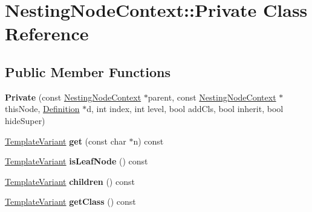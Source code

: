 \hypertarget{class_nesting_node_context_1_1_private}{}\section{Nesting\+Node\+Context\+::Private Class Reference}
\label{class_nesting_node_context_1_1_private}
\subsection*{Public Member Functions}
\begin{DoxyCompactItemize}
\item 
\mbox{\label{class_nesting_node_context_1_1_private_afd833b8f39bf1fce3a21b96e15a5de10}} 
{\bfseries Private} (const \mbox{\hyperlink{class_nesting_node_context}{Nesting\+Node\+Context}} $\ast$parent, const \mbox{\hyperlink{class_nesting_node_context}{Nesting\+Node\+Context}} $\ast$this\+Node, \mbox{\hyperlink{class_definition}{Definition}} $\ast$d, int index, int level, bool add\+Cls, bool inherit, bool hide\+Super)
\item 
\mbox{\label{class_nesting_node_context_1_1_private_aff4ba65cd777440da1b8933ce68e07a4}} 
\mbox{\hyperlink{class_template_variant}{Template\+Variant}} {\bfseries get} (const char $\ast$n) const
\item 
\mbox{\label{class_nesting_node_context_1_1_private_a6d570fc55ae6f2b04a7eec21c294de6f}} 
\mbox{\hyperlink{class_template_variant}{Template\+Variant}} {\bfseries is\+Leaf\+Node} () const
\item 
\mbox{\label{class_nesting_node_context_1_1_private_ac27dfb15571630ca77f6709cd6cdd209}} 
\mbox{\hyperlink{class_template_variant}{Template\+Variant}} {\bfseries children} () const
\item 
\mbox{\label{class_nesting_node_context_1_1_private_afd14749e69f54de54a18d807cd459071}} 
\mbox{\hyperlink{class_template_variant}{Template\+Variant}} {\bfseries get\+Class} () const
\item 
\mbox{\label{class_nesting_node_context_1_1_private_a3fe8d9098abe907ac1b7455dc7d0fe7d}} 

\end{DoxyCompactItemize}
